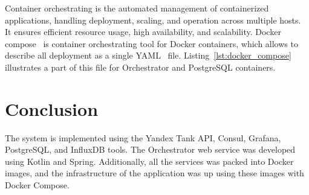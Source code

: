 Container orchestrating is the automated management of containerized applications, handling deployment, scaling, and operation across multiple hosts. It ensures efficient resource usage, high availability, and scalability.
Docker compose~\cite{docker_compose} is container orchestrating tool for Docker containers, which allows to describe all deployment as a single YAML~\cite{yaml} file. Listing~\ref{lst:docker_compose} illustrates a part of this file for Orchestrator and PostgreSQL containers.



\section{Conclusion}\label{sec:conclusion}
The system is implemented using the Yandex Tank API, Consul, Grafana, PostgreSQL, and InfluxDB tools. The Orchestrator web service was developed using Kotlin and Spring. Additionally, all the services was packed into Docker images, and the infrastructure of the application was up using these images with Docker Compose.
